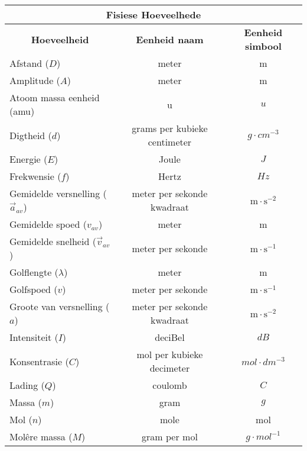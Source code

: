 \small{
\begin{table}[H]
\begin{center}
\begin{tabular}{|l|c|c|}\hline \hline 
\multicolumn{3}{|c|}{\textbf{Fisiese Hoeveelhede}}\\ \hline \hline
\multicolumn{1}{|c|}{\textbf{Hoeveelheid}} & \textbf{Eenheid naam} & \textbf{Eenheid simbool}\\ \hline
Afstand ($D$)             & meter & m                               \\ \hline
Amplitude ($A$)             & meter & m                              \\ \hline
Atoom massa eenheid (amu)               & u & $u$  \\ \hline
Digtheid ($d$)                & grams per kubieke centimeter & $g \cdot cm^{-3}$           \\ \hline
Energie ($E$)             & Joule & $J$ \\ \hline
Frekwensie ($f$)             & Hertz &  $Hz$   \\ \hline
Gemidelde versnelling ($\vec{a}_{av}$)  & meter per sekonde kwadraat & $\text{m} \cdot \text{s}^{-2}$  \\ \hline
Gemidelde spoed ($v_{av}$)        & meter & m                               \\ \hline
Gemidelde snelheid ($\vec{v}_{av}$)  & meter per sekonde & $\text{m} \cdot \text{s}^{-1}$  \\ \hline
Golflengte ($\lambda$)       & meter & m                                \\ \hline
Golfspoed ($v$)             & meter per sekonde & $\text{m} \cdot \text{s}^{-1}$ \\ \hline
Groote van versnelling ($a$)   & meter per sekonde kwadraat & $\text{m} \cdot \text{s}^{-2}$  \\ \hline
Intensiteit ($I$)            & deciBel &   $dB$                         \\ \hline
Konsentrasie ($C$)             & mol per kubieke decimeter & $mol \cdot dm^{-3}$  \\ \hline
Lading ($Q$)             & coulomb                   &  $C$                \\ \hline
Massa ($m$)             & gram & $g$\\ \hline
Mol ($n$)             & mole & mol     \\ \hline
Mol\^{e}re massa ($M$)             & gram per mol & $g \cdot mol^{-1}$              \\ \hline

\end{tabular}
\end{center}
\end{table}}
